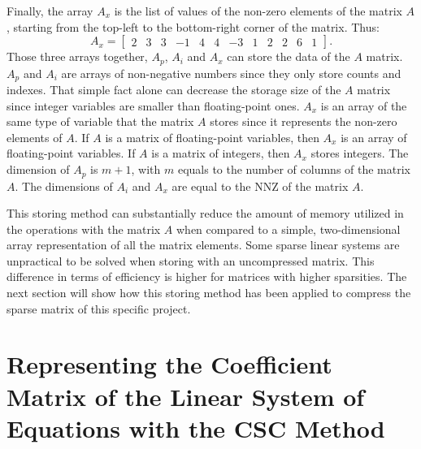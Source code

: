 Finally, the array $A_x$ is the list of values of the non-zero elements of the matrix $A$, starting from the top-left to the bottom-right corner of the matrix. Thus: 
	\begin{equation}
	A_x = 
	\begin{bmatrix}
	2	&3	&3	&-1	&4	&4	&-3	&1	&2	&2	&6	&1
	\end{bmatrix}
	.
	\end{equation}
Those three arrays together, $A_p$, $A_i$ and $A_x$ can store the data of the $A$ matrix. $A_p$ and $A_i$ are arrays of non-negative numbers since they only store counts and indexes. That simple fact alone can decrease the storage size of the $A$ matrix since integer variables are smaller than floating-point ones. $A_x$ is an array of the same type of variable that the matrix $A$ stores since it represents the non-zero elements of $A$. If $A$ is a matrix of floating-point variables, then $A_x$ is an array of floating-point variables. If $A$ is a matrix of integers, then $A_x$ stores integers. The dimension of $A_p$ is $m+1$, with $m$ equals to the number of columns of the matrix $A$. The dimensions of $A_i$ and $A_x$ are equal to the NNZ of the matrix $A$. 

This storing method can substantially reduce the amount of memory utilized in the operations with the matrix $A$ when compared to a simple, two-dimensional array representation of all the matrix elements. Some sparse linear systems are unpractical to be solved when storing with an uncompressed matrix. This difference in terms of efficiency is higher for matrices with higher sparsities. The next section will show how this storing method has been applied to compress the sparse matrix of this specific project.

\section{Representing the Coefficient Matrix of the Linear System of Equations with the CSC Method}

